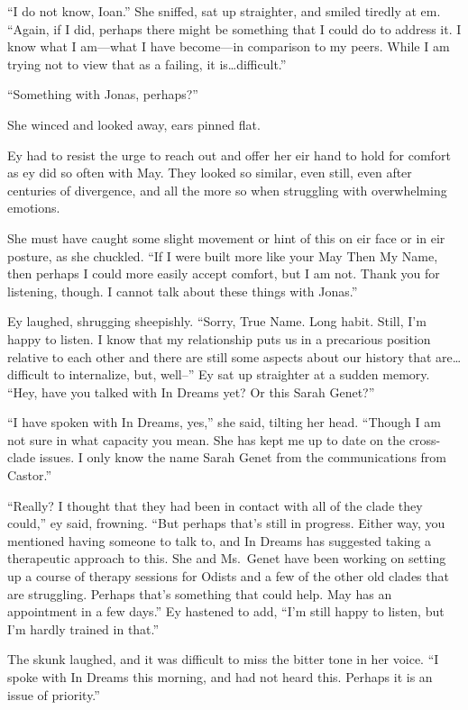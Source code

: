``I do not know, Ioan.'' She sniffed, sat up straighter, and smiled tiredly at em. ``Again, if I did, perhaps there might be something that I could do to address it. I know what I am—what I have become—in comparison to my peers. While I am trying not to view that as a failing, it is\ldots difficult.''

``Something with Jonas, perhaps?''

She winced and looked away, ears pinned flat.

Ey had to resist the urge to reach out and offer her eir hand to hold for comfort as ey did so often with May. They looked so similar, even still, even after centuries of divergence, and all the more so when struggling with overwhelming emotions.

She must have caught some slight movement or hint of this on eir face or in eir posture, as she chuckled. ``If I were built more like your May Then My Name, then perhaps I could more easily accept comfort, but I am not. Thank you for listening, though. I cannot talk about these things with Jonas.''

Ey laughed, shrugging sheepishly. ``Sorry, True Name. Long habit. Still, I'm happy to listen. I know that my relationship puts us in a precarious position relative to each other and there are still some aspects about our history that are\ldots difficult to internalize, but, well--'' Ey sat up straighter at a sudden memory. ``Hey, have you talked with In Dreams yet? Or this Sarah Genet?''

``I have spoken with In Dreams, yes,'' she said, tilting her head. ``Though I am not sure in what capacity you mean. She has kept me up to date on the cross-clade issues. I only know the name Sarah Genet from the communications from Castor.''

``Really? I thought that they had been in contact with all of the clade they could,'' ey said, frowning. ``But perhaps that's still in progress. Either way, you mentioned having someone to talk to, and In Dreams has suggested taking a therapeutic approach to this. She and Ms.~Genet have been working on setting up a course of therapy sessions for Odists and a few of the other old clades that are struggling. Perhaps that's something that could help. May has an appointment in a few days.'' Ey hastened to add, ``I'm still happy to listen, but I'm hardly trained in that.''

The skunk laughed, and it was difficult to miss the bitter tone in her voice. ``I spoke with In Dreams this morning, and had not heard this. Perhaps it is an issue of priority.''

